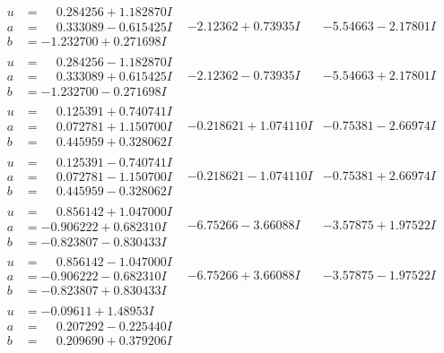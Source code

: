 \documentclass[1p]{elsarticle_modified}
\theoremstyle{definition}
\begin{document}
$$\begin{array}{c|c|c}
\begin{aligned}
u &= \phantom{-}0.284256 + 1.182870 I \\
a &= \phantom{-}0.333089 - 0.615425 I \\
b &= -1.232700 + 0.271698 I\end{aligned}
 & -2.12362 + 0.73935 I & -5.54663 - 2.17801 I \\ \hline\begin{aligned}
u &= \phantom{-}0.284256 - 1.182870 I \\
a &= \phantom{-}0.333089 + 0.615425 I \\
b &= -1.232700 - 0.271698 I\end{aligned}
 & -2.12362 - 0.73935 I & -5.54663 + 2.17801 I \\ \hline\begin{aligned}
u &= \phantom{-}0.125391 + 0.740741 I \\
a &= \phantom{-}0.072781 + 1.150700 I \\
b &= \phantom{-}0.445959 + 0.328062 I\end{aligned}
 & -0.218621 + 1.074110 I & -0.75381 - 2.66974 I \\ \hline\begin{aligned}
u &= \phantom{-}0.125391 - 0.740741 I \\
a &= \phantom{-}0.072781 - 1.150700 I \\
b &= \phantom{-}0.445959 - 0.328062 I\end{aligned}
 & -0.218621 - 1.074110 I & -0.75381 + 2.66974 I \\ \hline\begin{aligned}
u &= \phantom{-}0.856142 + 1.047000 I \\
a &= -0.906222 + 0.682310 I \\
b &= -0.823807 - 0.830433 I\end{aligned}
 & -6.75266 - 3.66088 I & -3.57875 + 1.97522 I \\ \hline\begin{aligned}
u &= \phantom{-}0.856142 - 1.047000 I \\
a &= -0.906222 - 0.682310 I \\
b &= -0.823807 + 0.830433 I\end{aligned}
 & -6.75266 + 3.66088 I & -3.57875 - 1.97522 I \\ \hline\begin{aligned}
u &= -0.09611 + 1.48953 I \\
a &= \phantom{-}0.207292 - 0.225440 I \\
b &= \phantom{-}0.209690 + 0.379206 I\end{aligned}

\end{array}$$
\end{document}
